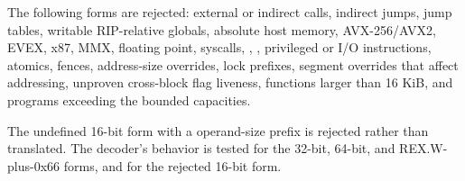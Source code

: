 The following forms are rejected: external or indirect calls, indirect jumps,
jump tables, writable RIP-relative globals, absolute host memory, AVX-256/AVX2,
EVEX, x87, MMX, floating point, syscalls, , , privileged
or I/O instructions, atomics, fences, address-size overrides, lock prefixes,
segment overrides that affect addressing, unproven cross-block flag liveness,
functions larger than 16 KiB, and programs exceeding the bounded capacities.

The undefined 16-bit  form with a  operand-size prefix is
rejected rather than translated. The decoder's behavior is tested for the
32-bit, 64-bit, and REX.W-plus-0x66 forms, and for the rejected 16-bit form.
